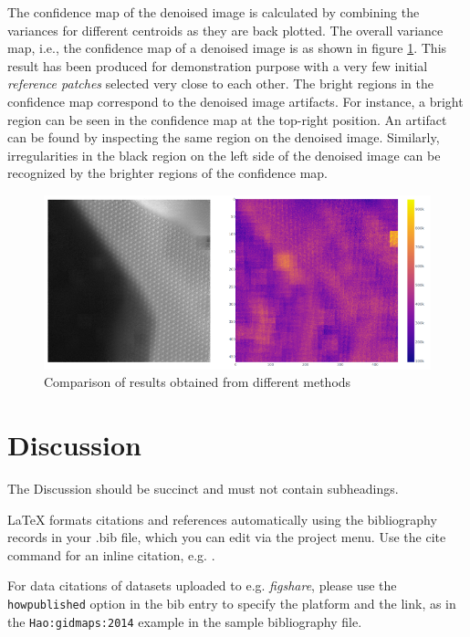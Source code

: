 \documentclass[fleqn,10pt]{wlscirep}
\begin{document}
The confidence map of the denoised image is calculated by combining the variances\cite{chan1982updating} for different centroids as they are back plotted. The overall variance map, i.e., the confidence map of a denoised image is as shown in figure \ref{fig:confidence_map}. This result has been produced for demonstration purpose with a very few initial \textit{reference patches} selected very close to each other. The bright regions in the confidence map correspond to the denoised image artifacts. For instance, a bright region can be seen in the confidence map at the top-right position. An artifact can be found by inspecting the same region on the denoised image. Similarly, irregularities in the black region on the left side of the denoised image can be recognized by the brighter regions of the confidence map.

\begin{figure}[H]
	\centering
	\includegraphics[scale=0.7]{./imgs/confidence_map.png}
	\caption{Comparison of results obtained from different methods}
	\label{fig:confidence_map}
\end{figure}

\section*{Discussion}

The Discussion should be succinct and must not contain subheadings.
 



\noindent LaTeX formats citations and references automatically using the bibliography records in your .bib file, which you can edit via the project menu. Use the cite command for an inline citation, e.g.  \cite{Hao:gidmaps:2014}.

For data citations of datasets uploaded to e.g. \emph{figshare}, please use the \verb|howpublished| option in the bib entry to specify the platform and the link, as in the \verb|Hao:gidmaps:2014| example in the sample bibliography file.
\end{document}
